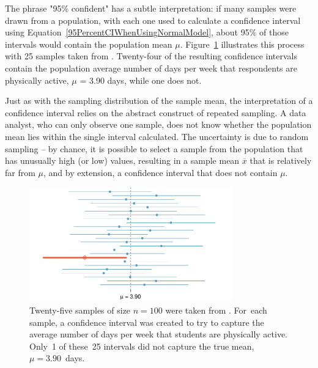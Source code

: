 \begin{spacing}{1.5}
The phrase "95\% confident" has a subtle interpretation: if many samples were drawn from a population, with each one used to calculate a confidence interval using Equation~\ref{95PercentCIWhenUsingNormalModel}, about 95\% of those intervals would contain the population mean $\mu$. Figure~\ref{95PercentConfidenceInterval} illustrates this process with 25 samples taken from . Twenty-four of the resulting confidence intervals contain the population average number of days per week that respondents are physically active, $\mu$ = 3.90 days, while one does not. 

Just as with the sampling distribution of the sample mean, the interpretation of a confidence interval relies on the abstract construct of repeated sampling. A data analyst, who can only observe one sample, does not know whether the population mean lies within the single interval calculated. The uncertainty is due to random sampling -- by chance, it is possible to select a sample from the population that has unusually high (or low) values, resulting in a sample mean $\overline{x}$ that is relatively far from $\mu$, and by extension, a confidence interval that does not contain $\mu$. 

\begin{figure}[hht]
   \centering
   \includegraphics[width=0.78\textwidth]
{ch_inference_foundations_oi_biostat/figures/95PercentConfidenceInterval/95PercentConfidenceInterval}
   \caption{Twenty-five samples of size $n=100$ were taken from . For~each sample, a confidence interval was created to try to capture the average number of days per week that students are physically active. Only~1 of these~25 intervals did not capture the true mean, $\mu = 3.90$~days.}
   \label{95PercentConfidenceInterval}
\end{figure}

\end{spacing}
